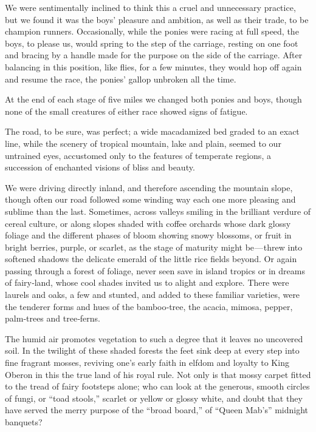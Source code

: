 \documentclass[12pt]{book}
\begin{document}
We were sentimentally inclined to think this a cruel and unnecessary practice,
but we found it was the boys’ pleasure and ambition, as well as their trade, to be
champion runners. Occasionally, while the ponies were racing at full speed, the
boys, to please us, would spring to the step of the carriage, resting on one foot
and bracing by a handle made for the purpose on the side of the carriage. After
balancing in this position, like flies, for a few minutes, they would hop off again
and resume the race, the ponies’ gallop unbroken all the time.

At the end of each stage of five miles we changed both ponies and boys,
though none of the small creatures of either race showed signs of fatigue.

The road, to be sure, was perfect; a wide macadamized bed graded to an
exact line, while the scenery of tropical mountain, lake and plain, seemed to our
untrained eyes, accustomed only to the features of temperate regions, a succession
of enchanted visions of bliss and beauty.

We were driving directly inland, and therefore ascending the mountain slope,
though often our road followed some winding way each one more pleasing and
sublime than the last. Sometimes, across valleys smiling in the brilliant verdure
of cereal culture, or along slopes shaded with coffee orchards whose dark glossy
foliage and the different phases of bloom showing snowy blossoms, or fruit in
bright berries, purple, or scarlet, as the stage of maturity might be — threw into
softened shadows the delicate emerald of the little rice fields beyond. Or again
passing through a forest of foliage, never seen save in island tropics or in dreams
of fairy‐land, whose cool shades invited us to alight and explore. There were
laurels and oaks, a few and stunted, and added to these familiar varieties, were
the tenderer forms and hues of the bamboo‐tree, the acacia, mimosa, pepper,
palm‐trees and tree‐ferns.

The humid air promotes vegetation to such a degree that it leaves no uncovered
soil. In the twilight of these shaded forests the feet sink deep at every step into
fine fragrant mosses, reviving one’s early faith in elfdom and loyalty to King
Oberon in this the true land of his royal rule. Not only is that mossy carpet fitted
to the tread of fairy footsteps alone; who can look at the generous, smooth circles
of fungi, or “toad stools,” scarlet or yellow or glossy white, and doubt that they
have served the merry purpose of the “broad board,” of “Queen Mab’s” midnight
banquets?
\end{document}
